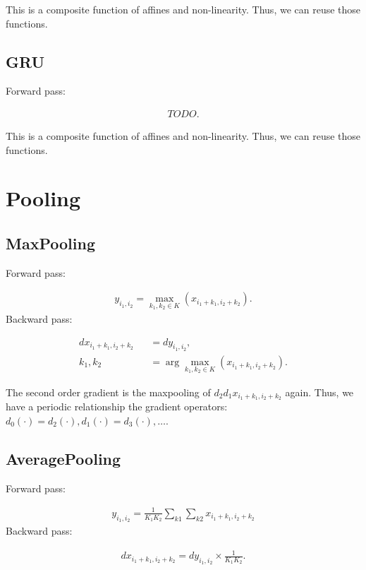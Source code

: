 \documentclass{article}
\begin{document}
This is a composite function of affines and non-linearity. Thus, we can reuse those functions.

\subsection{GRU}

Forward pass:

\begin{eqnarray}
  TODO.  
\end{eqnarray}

This is a composite function of affines and non-linearity. Thus, we can reuse those functions.


\section{Pooling}

\subsection{MaxPooling}

Forward pass:

\begin{eqnarray}
  y_{i_1, i_2} = \max_{k_1, k_2 \in K} (x_{i_1 + k_1, i_2 + k_2}).
\end{eqnarray}
%
Backward pass:

\begin{eqnarray}
  dx_{i_1 + k_1, i_2 + k_2} &&= dy_{i_1, i_2}, \\
  k_1, k_2 &&= \arg \max_{k_1, k_2 \in K} (x_{i_1 + k_1, i_2 + k_2}).
\end{eqnarray}

The second order gradient is the maxpooling of $d_2d_1 x_{i_1 + k_1, i_2 + k_2}$ again. Thus, we have a periodic relationship the gradient operators: $d_0(\cdot) = d_2(\cdot), d_1(\cdot) = d_3(\cdot), \ldots$.


\subsection{AveragePooling}

Forward pass:

\begin{eqnarray}
  y_{i_1, i_2} = \frac{1}{K_1 K_2} \sum_{k1} \sum_{k2} x_{i_1 + k_1, i_2 + k_2}    
\end{eqnarray}
%
Backward pass:

\begin{eqnarray}
  dx_{i_1 + k_1, i_2 + k_2} = dy_{i_1, i_2} \times \frac{1}{K_1K_2}.
\end{eqnarray}
\end{document}
